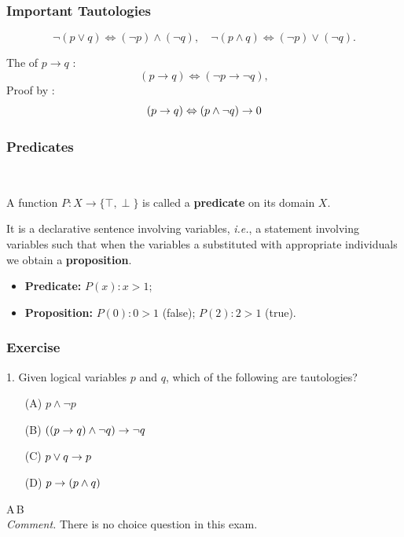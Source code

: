 \documentclass{beamer}
\newcommand{\myfont}{\rmfamily\normalsize\upshape\mdseries}
\newcommand{\mydef}[1]{\sffamily\blue{#1}\myfont\\} %
\begin{document}
\begin{frame}
    \frametitle{Important Tautologies}
    \par {}
	$$
	\neg(p \vee q) \Leftrightarrow(\neg p) \wedge(\neg q), \quad \neg(p \wedge q) \Leftrightarrow(\neg p) \vee(\neg q) .
	$$
	\par \phantom{ji}
	\par The  of $p \rightarrow q$ :
	$$
	(p \rightarrow q) \Leftrightarrow(\neg p \rightarrow \neg q),
	$$
	Proof by :
    $$
    (p \rightarrow q) \Leftrightarrow (p \wedge \neg q) \rightarrow 0
    $$
\end{frame}
\begin{frame}
    \frametitle{Predicates}
    \mydef{Definition}
    \par \hh A function $P: X \to \{\top, \perp \}$ is called a \textbf{predicate} on its domain $X$. 
    \\\vv
    \par \hh It is a declarative sentence involving variables, \textit{i.e.}, a statement involving variables such that when the variables a substituted with appropriate individuals we obtain a \textbf{proposition}.
    \\\vv
    \begin{itemize}
        \item \textbf{Predicate:} $P(x): x>1$;
        \item \textbf{Proposition:} $P(0): 0>1$ (false); $P(2): 2>1$ (true).
    \end{itemize}
\end{frame}
\begin{frame}
    \frametitle{Exercise}
    1. Given logical variables $p$ and $q$, which of the following are tautologies?
    \begin{itemize}
        \item[(A)] $p\wedge \neg p$
        \item[(B)] $((p\rightarrow q )\wedge \neg q )\rightarrow \neg q$
        \item[(C)] $p \vee q \rightarrow p$
        \item[(D)] $p \rightarrow(p \wedge q)$  
    \end{itemize}
    \vv 
     \textcolor[cmyk]{0.01,0.01,0.01,0.01}{A\,B}
    \\ \vv 
    \textit{Comment.} There is no choice question in this exam.
\end{frame}
\end{document}

